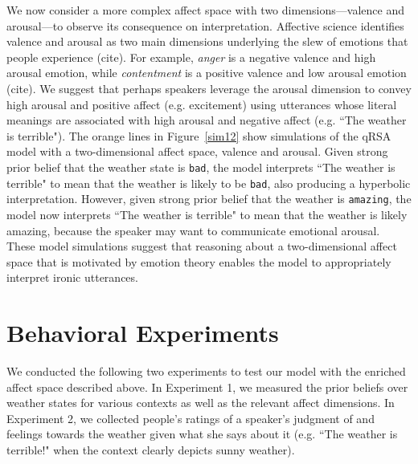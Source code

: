 \documentclass[10pt,letterpaper]{article}
\begin{document}
We now consider a more complex affect space with two dimensions---valence and arousal---to observe its consequence on interpretation. Affective science identifies valence and arousal as two main dimensions underlying the slew of emotions that people experience (cite). For example, \emph{anger} is a negative valence and high arousal emotion, while \emph{contentment} is a positive valence and low arousal emotion (cite). We suggest that perhaps speakers leverage the arousal dimension to convey high arousal and positive affect (e.g. excitement) using utterances whose literal meanings are associated with high arousal and negative affect (e.g. ``The weather is terrible"). The orange lines in Figure~\ref{sim12} show simulations of the qRSA model with a two-dimensional affect space, valence and arousal. Given strong prior belief that the weather state is \texttt{bad}, the model interprets ``The weather is terrible" to mean that the weather is likely to be \texttt{bad}, also producing a hyperbolic interpretation. However, given strong prior belief that the weather is \texttt{amazing}, the model now interprets ``The weather is terrible" to mean that the weather is likely amazing, because the speaker may want to communicate emotional arousal. These model simulations suggest that reasoning about a two-dimensional affect space that is motivated by emotion theory enables the model to appropriately interpret ironic utterances. 



\section{Behavioral Experiments}
We conducted the following two experiments to test our model with the enriched affect space described above. In Experiment 1, we measured the prior beliefs over weather states for various contexts as well as the relevant affect dimensions. In Experiment 2, we collected people's ratings of a speaker's judgment of and feelings towards the weather given what she says about it (e.g. ``The weather is terrible!" when the context clearly depicts sunny weather).
\end{document}
